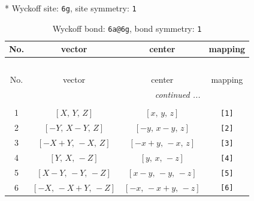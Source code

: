 \documentclass[fleqn,8pt]{jsarticle}
\begin{document}
* Wyckoff site: {\tt 6g}, site symmetry: {\tt 1}
\renewcommand{\arraystretch}{1.2}
\begin{longtable}{cccc}
\caption{Wyckoff bond: {\tt 6a@6g}, bond symmetry: {\tt 1}}
 \\
 \hline \hline
No. & vector & center & mapping \\ \hline \endfirsthead

\multicolumn{3}{l}{\tablename\ \thetable{}} \\
 \hline \hline
No. & vector & center & mapping \\ \hline \endhead

 \hline \hline
\multicolumn{3}{r}{\footnotesize\it continued ...} \\ \endfoot

 \hline \hline
\multicolumn{3}{r}{} \\ \endlastfoot

1 & $\left[ X,\, Y,\, Z \right]$ & $\left[ x,\, y,\, z \right]$ & {\tt [1]} \\ \hline
2 & $\left[ - Y,\, X - Y,\, Z \right]$ & $\left[ - y,\, x - y,\, z \right]$ & {\tt [2]} \\ \hline
3 & $\left[ - X + Y,\, - X,\, Z \right]$ & $\left[ - x + y,\, - x,\, z \right]$ & {\tt [3]} \\ \hline
4 & $\left[ Y,\, X,\, - Z \right]$ & $\left[ y,\, x,\, - z \right]$ & {\tt [4]} \\ \hline
5 & $\left[ X - Y,\, - Y,\, - Z \right]$ & $\left[ x - y,\, - y,\, - z \right]$ & {\tt [5]} \\ \hline
6 & $\left[ - X,\, - X + Y,\, - Z \right]$ & $\left[ - x,\, - x + y,\, - z \right]$ & {\tt [6]} \\
\end{longtable}
\end{document}
